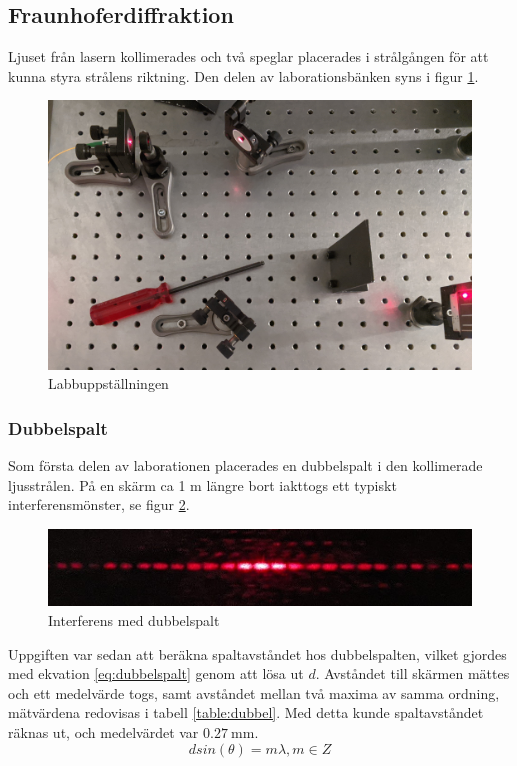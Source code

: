 \documentclass[a4paper]{article}
\begin{document}
\subsection{Fraunhoferdiffraktion}
Ljuset från lasern kollimerades och två speglar placerades i strålgången för att kunna styra strålens riktning. Den delen av laborationsbänken syns i figur \ref{fig:uppst}.
\begin{figure}[h!]
	\centering
	\includegraphics[width=\textwidth]{speglar.jpg}
	\caption{Labbuppställningen}
	\label{fig:uppst}
\end{figure}

\subsubsection{Dubbelspalt}
Som första delen av laborationen placerades en dubbelspalt i den kollimerade ljusstrålen. På en skärm ca 1 m längre bort iakttogs ett typiskt interferensmönster, se figur \ref{fig:dubbelspalt}.
\begin{figure}[h!]
\centering
\includegraphics[width=\textwidth]{2spalt.jpg}
\caption{Interferens med dubbelspalt}
\label{fig:dubbelspalt}
\end{figure}
Uppgiften var sedan att beräkna spaltavståndet hos dubbelspalten, vilket gjordes med ekvation \ref{eq:dubbelspalt} genom att lösa ut $d$. Avståndet till skärmen mättes och ett
medelvärde togs, samt avståndet mellan två maxima av samma ordning, mätvärdena redovisas i tabell \ref{table:dubbel}. Med detta kunde spaltavståndet räknas ut, och medelvärdet
var $\SI{0.27}{\milli\meter}$.
\begin{equation}
	d sin(\theta) = m\lambda, m \in Z
	\label{eq:dubbelspalt}
\end{equation}
\end{document}
